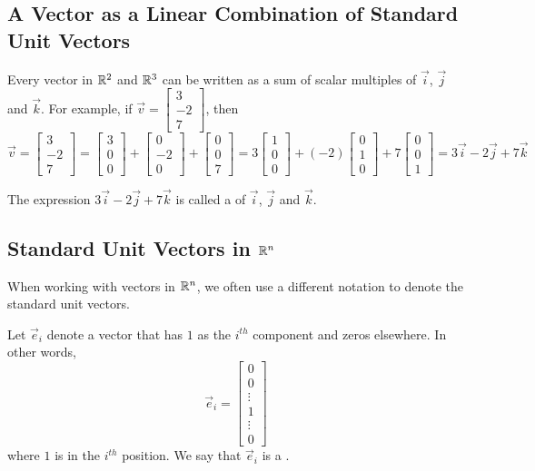\documentclass{ximera}
\begin{document}
\subsection*{A Vector as a Linear Combination of Standard Unit Vectors} 
Every vector in $\mathbb{R}^2$ and $\mathbb{R}^3$ can be written as a sum of scalar multiples of $\vec{i}$, $\vec{j}$ and $\vec{k}$.  For example, if $\vec{v}=\begin{bmatrix}
3\\
-2\\
7
\end{bmatrix}$, then
$$\vec{v}=\begin{bmatrix}
3\\
-2\\
7
\end{bmatrix}=\begin{bmatrix}
3\\
0\\
0
\end{bmatrix}+\begin{bmatrix}
0\\
-2\\
0
\end{bmatrix}+\begin{bmatrix}
0\\
0\\
7
\end{bmatrix}=3\begin{bmatrix}
1\\
0\\
0
\end{bmatrix}+(-2)\begin{bmatrix}
0\\
1\\
0
\end{bmatrix}+7\begin{bmatrix}
0\\
0\\
1
\end{bmatrix}=3\vec{i}-2\vec{j}+7\vec{k}$$

The expression $3\vec{i}-2\vec{j}+7\vec{k}$ is called a  of $\vec{i}$, $\vec{j}$ and $\vec{k}$. 

\subsection*{Standard Unit Vectors in $\mathbb{R}^n$}
When working with vectors in $\mathbb{R}^n$, we often use a different notation to denote the standard unit vectors.


  \begin{definition}\label{def:standardunitvecrn} 
  Let $\vec{e}_i$ denote a vector that has $1$ as the $i^{th}$ component and zeros elsewhere.  In other words, $$\vec{e}_i=\begin{bmatrix}
0\\
0\\
\vdots\\
1\\
\vdots\\
0
\end{bmatrix}$$ 
  where $1$ is in the $i^{th}$ position.  We say that  $\vec{e}_i$ is a .
\end{definition}
\end{document}
